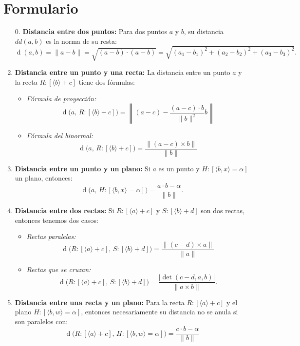 \documentclass[11pt, a4paper]{article} %
\DeclareMathOperator{\dd}{d}
\begin{document}
\section{Formulario}
\begin{enumerate}[label = \textbf{\arabic*.}]

\item[0.] \textbf{Distancia entre dos puntos:}  Para dos puntos \(a\) y \(b\), su distancia \( dd(a,b)\) es la norma de su resta:
\[ \dd(a,b)=\|a-b\|=\sqrt{(a-b)\cdot (a-b)}=\sqrt{(a_1-b_1)^2+(a_2-b_2)^2+(a_3-b_3)^2}.\]

\item	\textbf{Distancia entre un punto y una recta:} La distancia entre un punto \(a\) y la recta \( R: [\langle b\rangle +c] \) tiene dos fórmulas:

\begin{itemize}
\item\emph{Fórmula de proyección:}
\[\dd\Big( a,\,R:[\langle b\rangle+c]\Big) =\left \|(a-c)-\dfrac{(a-c) \cdot b}{\|b\|^2}b \right\| \]
\item\emph{Fórmula del binormal:}\[\dd \big( a, \, R:[\langle b \rangle + c] \big) = \dfrac{ \big\|(a-c) \times b \big\|}{\| b \|} \]
\end{itemize}

\item	\textbf{Distancia entre un punto y un plano:} Si \(a\) es un punto y \(H:[\langle b,x\rangle = \alpha]\) un plano, entonces:\[\dd \big( a, \, H:[ \langle b,x \rangle = \alpha] \big) =\dfrac{ a \cdot b - \alpha }{ \|b\| }.\]

\item \textbf{Distancia entre dos rectas:} Si  \( R:[\langle a \rangle + c] \) y  \( S: [\langle b \rangle + d]\) son dos rectas, entonces tenemos dos casos:

\begin{itemize}
\item\emph{Rectas paralelas:}\[ \dd \big(  R: [ \langle a \rangle + c ], \, S : [ \langle b \rangle + d ] \big) =\dfrac{ \big\| (c-d)  \times a \big\| }{ \| a  \| }\]\item\emph{Rectas que se cruzan:}\[\dd \big(  R: [ \langle a \rangle + c ], \, S : [ \langle b \rangle + d ] \big) 
	=\dfrac{ \big| \det( c-d, a, b ) \big| }{ \| a\times b\| }.\]
\end{itemize}
			
\item  \textbf{Distancia entre una recta y un plano:} 
Para la recta 
\( R:[ \langle a \rangle + c] \) y el plano  \( H: [\langle b,w\rangle=\alpha]\), entonces necesariamente su distancia no se anula si son paralelos con:
\[\dd \big(  R: [ \langle a \rangle + c ], \, H : [ \langle b, w \rangle = \alpha ] \big) 
=
			\dfrac{c \cdot b - \alpha}{\|b\|} 		\]
            

\end{enumerate}
\end{document}

